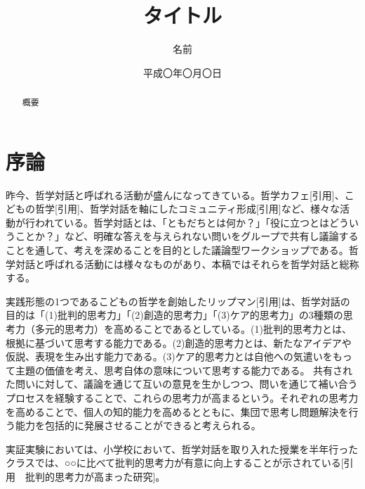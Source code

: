 \documentclass[11pt, a4paper]{jreport} %
\title{タイトル}
\author{名前}
\date{平成〇年〇月〇日}
\begin{document}
\maketitle

\begin{abstract}
概要
\end{abstract}

\tableofcontents

\chapter{序論}

昨今、哲学対話と呼ばれる活動が盛んになってきている。哲学カフェ[引用]、こどもの哲学[引用]、哲学対話を軸にしたコミュニティ形成[引用]など、様々な活動が行われている。哲学対話とは、「ともだちとは何か？」「役に立つとはどういうことか？」など、明確な答えを与えられない問いをグループで共有し議論することを通して、考えを深めることを目的とした議論型ワークショップである。哲学対話と呼ばれる活動には様々なものがあり、本稿ではそれらを哲学対話と総称する。%


実践形態の1つであるこどもの哲学を創始したリップマン[引用]は、哲学対話の目的は「(1)批判的思考力」「(2)創造的思考力」「(3)ケア的思考力」の3種類の思考力（多元的思考力）を高めることであるとしている。(1)批判的思考力とは、根拠に基づいて思考する能力である。(2)創造的思考力とは、新たなアイデアや仮説、表現を生み出す能力である。(3)ケア的思考力とは自他への気遣いをもって主題の価値を考え、思考自体の意味について思考する能力である。
共有された問いに対して、議論を通じて互いの意見を生かしつつ、問いを通じて補い合うプロセスを経験することで、これらの思考力が高まるという。それぞれの思考力を高めることで、個人の知的能力を高めるとともに、集団で思考し問題解決を行う能力を包括的に発展させることができると考えられる。


実証実験においては、小学校において、哲学対話を取り入れた授業を半年行ったクラスでは、○○に比べて批判的思考力が有意に向上することが示されている[引用　批判的思考力が高まった研究]。



\end{document}
